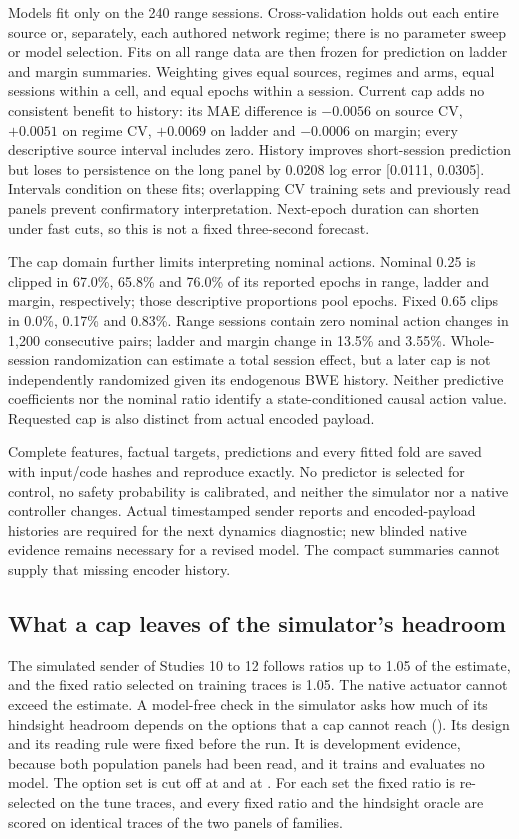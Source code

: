 {Models fit only on the 240 range sessions. Cross-validation holds out each entire source or, separately, each authored network regime; there is no parameter sweep or model selection. Fits on all range data are then frozen for prediction on ladder and margin summaries. Weighting gives equal sources, regimes and arms, equal sessions within a cell, and equal epochs within a session. Current cap adds no consistent benefit to history: its MAE difference is $-0.0056$ on source CV, $+0.0051$ on regime CV, $+0.0069$ on ladder and $-0.0006$ on margin; every descriptive source interval includes zero. History improves short-session prediction but loses to persistence on the long panel by 0.0208 log error [0.0111, 0.0305]. Intervals condition on these fits; overlapping CV training sets and previously read panels prevent confirmatory interpretation. Next-epoch duration can shorten under fast cuts, so this is not a fixed three-second forecast.

The cap domain further limits interpreting nominal actions. Nominal 0.25 is clipped in 67.0\%, 65.8\% and 76.0\% of its reported epochs in range, ladder and margin, respectively; those descriptive proportions pool epochs. Fixed 0.65 clips in 0.0\%, 0.17\% and 0.83\%. Range sessions contain zero nominal action changes in 1,200 consecutive pairs; ladder and margin change in 13.5\% and 3.55\%. Whole-session randomization can estimate a total session effect, but a later cap is not independently randomized given its endogenous BWE history. Neither predictive coefficients nor the nominal ratio identify a state-conditioned causal action value. Requested cap is also distinct from actual encoded payload.

Complete features, factual targets, predictions and every fitted fold are saved with input/code hashes and reproduce exactly. No predictor is selected for control, no safety probability is calibrated, and neither the simulator nor a native controller changes. Actual timestamped sender reports and encoded-payload histories are required for the next dynamics diagnostic; new blinded native evidence remains necessary for a revised model. The compact summaries cannot supply that missing encoder history.
}{}

\ifdefined\TypedHeadFamilies
\subsection{What a cap leaves of the simulator's headroom}
\label{sec:typed-headroom}
The simulated sender of Studies 10 to 12 follows ratios up to 1.05 of the estimate, and the fixed ratio selected on training traces is 1.05. The native actuator cannot exceed the estimate. A model-free check in the simulator asks how much of its hindsight headroom depends on the options that a cap cannot reach (). Its design and its reading rule were fixed before the run. It is development evidence, because both population panels had been read, and it trains and evaluates no model. The option set is cut off at \TypedHeadCapTop{} and at \TypedHeadLowTop{}. For each set the fixed ratio is re-selected on the tune traces, and every fixed ratio and the hindsight oracle are scored on identical traces of the two panels of \TypedHeadFamilies{} families.

